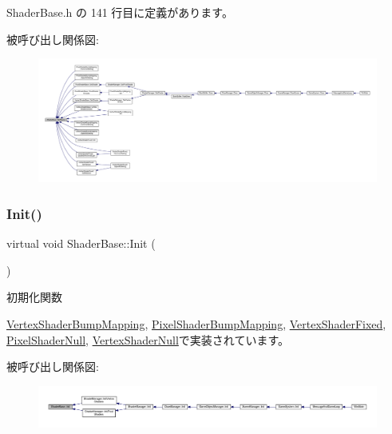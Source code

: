  Shader\+Base.\+h の 141 行目に定義があります。

被呼び出し関係図\+:
\nopagebreak
\begin{figure}[H]
\begin{center}
\leavevmode
\includegraphics[width=350pt]{class_shader_base_a4601ff3d20f01800ffd676d3db8d9289_icgraph}
\end{center}
\end{figure}
\mbox{\label{class_shader_base_a9622b2f5e0184a78d3af82820dc5113d}} 
\subsubsection{\texorpdfstring{Init()}{Init()}}
{\footnotesize\ttfamily virtual void Shader\+Base\+::\+Init (\begin{DoxyParamCaption}{ }\end{DoxyParamCaption})\hspace{0.3cm}{\ttfamily [pure virtual]}}



初期化関数 



\mbox{\hyperlink{class_vertex_shader_bump_mapping_a6c0f59d1f29fd883943a66bfe61b6b03}{Vertex\+Shader\+Bump\+Mapping}}, \mbox{\hyperlink{class_pixel_shader_bump_mapping_ab7807b7c56242e965ddb23e66e1a5d9e}{Pixel\+Shader\+Bump\+Mapping}}, \mbox{\hyperlink{class_vertex_shader_fixed_ae829ff736b33c45543804059255125b6}{Vertex\+Shader\+Fixed}}, \mbox{\hyperlink{class_pixel_shader_null_abfd7a6a986da09061a55d31024219eba}{Pixel\+Shader\+Null}}, \mbox{\hyperlink{class_vertex_shader_null_af30eb8057fe0537bc6ade214647b6fb5}{Vertex\+Shader\+Null}}で実装されています。

被呼び出し関係図\+:
\nopagebreak
\begin{figure}[H]
\begin{center}
\leavevmode
\includegraphics[width=350pt]{class_shader_base_a9622b2f5e0184a78d3af82820dc5113d_icgraph}
\end{center}
\end{figure}
\mbox{\label{class_shader_base_aaac3419f1fce5bf12973e827daadbf8c}} 
